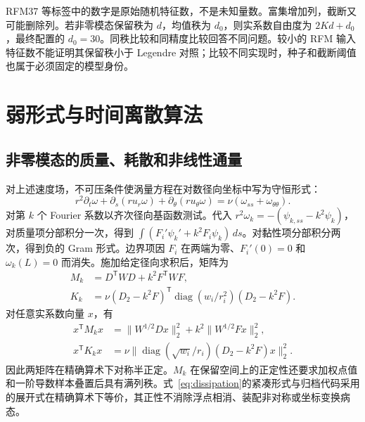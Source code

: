 RFM37 等标签中的数字是原始随机特征数，不是未知量数。富集增加列，截断又可能删除列。若非零模态保留秩为 \(d\)，均值秩为 \(d_0\)，则实系数自由度为 \(2Kd+d_0\)，最终配置的 \(d_0=30\)。同秩比较和同精度比较回答不同问题。较小的 RFM 输入特征数不能证明其保留秩小于 Legendre 对照；比较不同实现时，种子和截断阈值也属于必须固定的模型身份。



\section{弱形式与时间离散算法}
\label{sec:numerical-method}

\subsection{非零模态的质量、耗散和非线性通量}

对上述速度场，不可压条件使涡量方程在对数径向坐标中写为守恒形式：
\begin{equation}
 r^2\partial_t\omega+\partial_s(r u_r\omega)
 +\partial_\theta(r u_\theta\omega)
 =\nu(\omega_{ss}+\omega_{\theta\theta}).
 \label{eq:vorticity-conservative}
\end{equation}
对第 \(k\) 个 Fourier 系数以齐次径向基函数测试。代入 \(r^2\omega_k=-(\psi_{k,ss}-k^2\psi_k)\)，对质量项分部积分一次，得到 \(\int(F_i'\psi_k'+k^2F_i\psi_k)\,ds\)。对黏性项分部积分两次，得到负的 Gram 形式。边界项因 \(F_i\) 在两端为零、\(F_i'(0)=0\) 和 \(\omega_k(L)=0\) 而消失。施加给定径向求积后，矩阵为
\begin{align}
 M_k&=D^{\mathsf T}WD+k^2F^{\mathsf T}WF,
 \label{eq:mass}\\
 K_k&=\nu(D_2-k^2F)^{\mathsf T}
        \operatorname{diag}(w_i/r_i^2)(D_2-k^2F).
 \label{eq:dissipation}
\end{align}
对任意实系数向量 \(x\)，有
\begin{equation}
 \begin{aligned}
 x^{\mathsf T}M_kx&=\|W^{1/2}Dx\|_2^2+k^2\|W^{1/2}Fx\|_2^2,\\
 x^{\mathsf T}K_kx&=\nu\|
 \operatorname{diag}(\sqrt{w_i}/r_i)(D_2-k^2F)x\|_2^2.
 \end{aligned}
 \label{eq:gram-positivity}
\end{equation}
因此两矩阵在精确算术下对称半正定。\(M_k\) 在保留空间上的正定性还要求加权点值和一阶导数样本叠置后具有满列秩。式~\eqref{eq:dissipation}的紧凑形式与归档代码采用的展开式在精确算术下等价，其正性不消除浮点相消、装配非对称或坐标变换病态。

